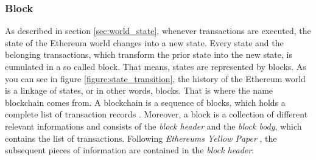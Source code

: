 \subsubsection{Block} 
\label{sec:block}
As described in section \ref{sec:world_state}, whenever transactions are executed, the state of the Ethereum world changes into a new state. Every state and the belonging transactions, which transform the prior state into the new state, is cumulated in a so called block. That means, states are represented by blocks. As you can see in figure \ref{figure:state_transition}, the history of the Ethereum world is a linkage of states, or in other words, blocks. That is where the name blockchain comes from. A blockchain is a sequence of blocks, which holds a complete list of transaction records . 
Moreover, a block is a collection of different relevant informations and consists of the \textit{block header} and the \textit{block body}, which contains the list of transactions. Following \textit{Ethereums Yellow Paper} , the subsequent pieces of information are contained in the \textit{block header}:

